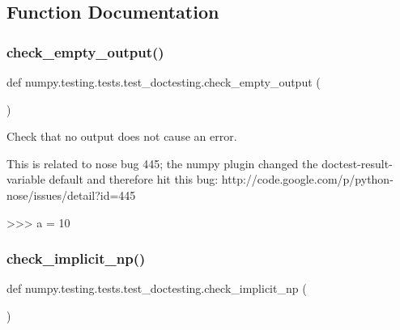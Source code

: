 \subsection{Function Documentation}
\mbox{\label{namespacenumpy_1_1testing_1_1tests_1_1test__doctesting_ad4a1a46dd1de4b1a792ac4e3794313fd}} 
\subsubsection{\texorpdfstring{check\+\_\+empty\+\_\+output()}{check\_empty\_output()}}
{\footnotesize\ttfamily def numpy.\+testing.\+tests.\+test\+\_\+doctesting.\+check\+\_\+empty\+\_\+output (\begin{DoxyParamCaption}{ }\end{DoxyParamCaption})}

\begin{DoxyVerb}Check that no output does not cause an error.

This is related to nose bug 445; the numpy plugin changed the
doctest-result-variable default and therefore hit this bug:
http://code.google.com/p/python-nose/issues/detail?id=445

>>> a = 10
\end{DoxyVerb}
 \mbox{\label{namespacenumpy_1_1testing_1_1tests_1_1test__doctesting_ae7d8a01857a6b1605092d87e42554cd5}} 
\subsubsection{\texorpdfstring{check\+\_\+implicit\+\_\+np()}{check\_implicit\_np()}}
{\footnotesize\ttfamily def numpy.\+testing.\+tests.\+test\+\_\+doctesting.\+check\+\_\+implicit\+\_\+np (\begin{DoxyParamCaption}{ }\end{DoxyParamCaption})}


